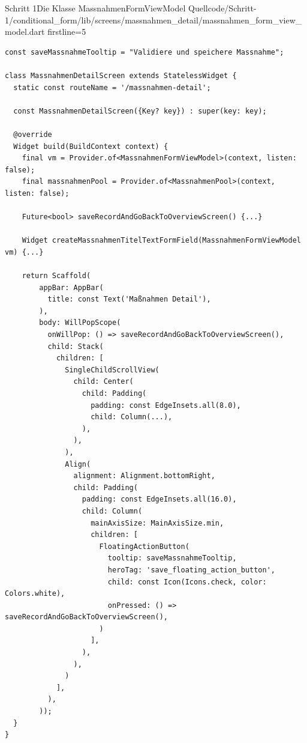 \begin{alexlisting}{Schritt 1}{Die Klasse MassnahmenFormViewModel}
  {Quellcode/Schritt-1/conditional_form/lib/screens/massnahmen_detail/massnahmen_form_view_model.dart}
  {firstline=5}
  \label{lst:Schritt1KlasseMassnahmenFormViewModel}
\end{alexlisting}







\begin{listing}[htbp]
  \begin{verbatim}
const saveMassnahmeTooltip = "Validiere und speichere Massnahme";

class MassnahmenDetailScreen extends StatelessWidget {
  static const routeName = '/massnahmen-detail';

  const MassnahmenDetailScreen({Key? key}) : super(key: key);

  @override
  Widget build(BuildContext context) {
    final vm = Provider.of<MassnahmenFormViewModel>(context, listen: false);
    final massnahmenPool = Provider.of<MassnahmenPool>(context, listen: false);

    Future<bool> saveRecordAndGoBackToOverviewScreen() {...}

    Widget createMassnahmenTitelTextFormField(MassnahmenFormViewModel vm) {...}

    return Scaffold(
        appBar: AppBar(
          title: const Text('Maßnahmen Detail'),
        ),
        body: WillPopScope(
          onWillPop: () => saveRecordAndGoBackToOverviewScreen(),
          child: Stack(
            children: [
              SingleChildScrollView(
                child: Center(
                  child: Padding(
                    padding: const EdgeInsets.all(8.0),
                    child: Column(...),
                  ),
                ),
              ),
              Align(
                alignment: Alignment.bottomRight,
                child: Padding(
                  padding: const EdgeInsets.all(16.0),
                  child: Column(
                    mainAxisSize: MainAxisSize.min,
                    children: [
                      FloatingActionButton(
                        tooltip: saveMassnahmeTooltip,
                        heroTag: 'save_floating_action_button',
                        child: const Icon(Icons.check, color: Colors.white),
                        onPressed: () => saveRecordAndGoBackToOverviewScreen(),
                      )
                    ],
                  ),
                ),
              )
            ],
          ),
        ));
  }
}
\end{verbatim}
  \caption[Schritt 1 Klasse MassnahmenDetailScreen Struktur]{Die Struktur des Bildschirms MassnahmenDetailScreen, Quelle: Eigenes Listing, Datei: Quellcode/Schritt-1/conditional_form/lib/\newline screens/massnahmen_detail/massnahmen_detail.dart}
  \label{lst:Schritt1KlasseMassnahmenDetailScreenStruktur}
\end{listing}



